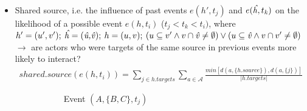 \begin{itemize}
\begin{itemize}
			\item Shared source, i.e. the influence of past events $e(h',t_j)$ and $e(\text{\emph{\^h}},t_k)$ on the likelihood of a possible event $e(h,t_i)$ ($t_j < t_k < t_i)$, where $h' = (u',v'); \: \text{\emph{\^h}} = (\text{\emph{\^u,\^v}}); \: h = (u,v); \: (u \subseteq v' \land v \cap \text{\emph{\^v}} \neq \emptyset) \lor (u \subseteq \text{\emph{\^v}} \land v \cap v' \neq \emptyset)$ $\rightarrow$ are actors who were targets of the same source in previous events more likely to interact?
			\begin{align*}
				shared.source(e(h,t_i)) = \sum_{j \in h.targets} \sum_{a \in \mathcal{A}} \frac{min[d(a,\{h.source\}),d(a,\{j\})]}{\lvert h.targets \rvert}
			\end{align*}
			\begin{figure}
				\begin{mdframed}
					\centering
					\begin{subfigure}[t]{0.3\linewidth}
						\vskip 0pt
						\caption{Event $(A,\{B,C\},t_j)$}
					\end{subfigure}
					\hfill
					\begin{subfigure}[t]{0.3\linewidth}
						\vskip 0pt
\end{subfigure}
\end{mdframed}
\end{figure}
\end{itemize}
\end{itemize}
